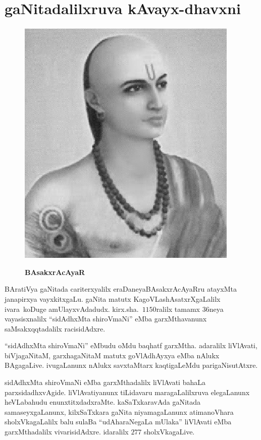 \chapter{gaNitadalilxruva kAvayx-dhavxni}\label{chap13}

\begin{figure}
  \centering\includegraphics[scale=0.8]{src/figures/bhaskaracharya-II.eps}
  
  {\bf BAsakxrAcAyaR}
    \end{figure}
    
BAratiVya gaNitada cariterxyalilx eraDaneya\break BAsakxrAcAyaRru atayxMta janapirxya vayxkitxgaLu.\- gaNita matutx KagoVLashAsatxrXgaLalilx \hbox{ivara koDuge} amUlayxvAdadudx. kirx.sha.\ $1150$ralilx tamamx $36$neya vayasisxnalilx ``sidAdhxMta shiroV\-maNi'' eMba garxMthavanunx saMsakxqqtadalilx racisidAdxre.

\smallskip

``sidAdhxMta shiroVmaNi'' eMbudu oMdu baqhatf garxMtha. adaralilx liVlAvati, biVjagaNitaM,\- garxhagaNitaM matutx goVlAdhAyxya eMba nAlukx BAgagaLive. ivugaLanunx nAlukx savxtaMtarx kaqti\-gaLeMdu parigaNisutAtxre.

\smallskip

sidAdhxMta shiroVmaNi eMba garxMthadalilx liVlAvati bahaLa parxsidadhxvAgide. liVlAvatiyanunx tiLidavaru maragaLalilxruva elegaLanunx heVLabahudu enunxtitxdadxraMte. kaSaTxkaravAda gaNitada samaseyxgaLanunx, kilxSaTxkara gaNita niyamagaLanunx atimanoVhara sholxVkagaLalilx balu sulaBa ``udAharaNegaLa mUlaka'' liVlAvati eMba garxMthadalilx vivarisidAdxre. idaralilx $277$ sholxVkagaLive.




